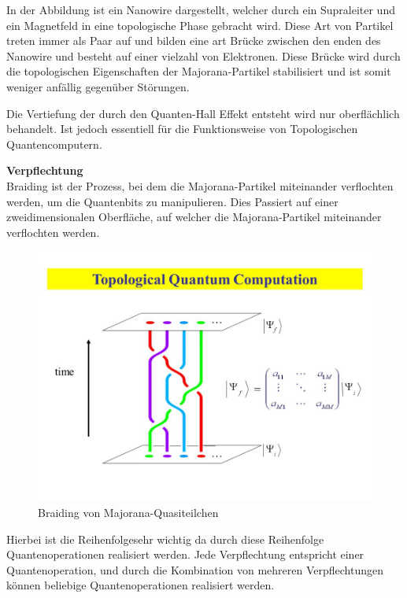 In der Abbildung ist ein Nanowire dargestellt, welcher durch ein Supraleiter und ein Magnetfeld in eine topologische Phase gebracht wird.
Diese Art von Partikel treten immer als Paar auf und bilden eine art Brücke zwischen den enden des Nanowire und besteht auf einer vielzahl von Elektronen.
Diese Brücke wird durch die topologischen Eigenschaften der Majorana-Partikel stabilisiert und ist somit weniger anfällig gegenüber Störungen.\\


\begin{tcolorbox}[title=Kommentar,
    title filled=false,
    colback=cyan!5!white,
    colframe=cyan!75!black]
    Die Vertiefung der durch den Quanten-Hall Effekt entsteht wird nur oberflächlich behandelt. Ist jedoch essentiell für die Funktionsweise von Topologischen Quantencomputern.
\end{tcolorbox}

\textbf{Verpflechtung}\\
Braiding ist der Prozess, bei dem die Majorana-Partikel miteinander verflochten werden, um die Quantenbits zu manipulieren. 
Dies Passiert auf einer zweidimensionalen Oberfläche, auf welcher die Majorana-Partikel miteinander verflochten werden.\\

\begin{figure}[H]
    \centering
    \includegraphics[width=0.75\linewidth]{img/TQC.png}
    \caption{Braiding von Majorana-Quasiteilchen}
    \label{fig:Braiding}
\end{figure}

Hierbei ist die Reihenfolgesehr wichtig da durch diese Reihenfolge Quantenoperationen realisiert werden.
Jede Verpflechtung entspricht einer Quantenoperation, und durch die Kombination von mehreren Verpflechtungen können beliebige Quantenoperationen realisiert werden.\\

